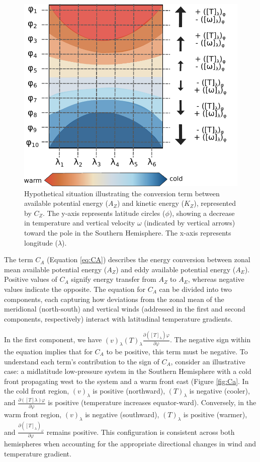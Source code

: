 \begin{figure}[h]
\begin{center}
\setcaptionmargin{1cm}
\includegraphics[width=0.75\columnwidth,angle=0]{fig/Cz.pdf}
\caption[$C_Z$ - representation]{Hypothetical situation illustrating the conversion term between available potential energy ($A_Z$) and kinetic energy ($K_Z$), represented by $C_Z$. The y-axis represents latitude circles ($\phi$), showing a decrease in temperature and vertical velocity $\omega$ (indicated by vertical arrows) toward the pole in the Southern Hemisphere. The x-axis represents longitude ($\lambda$).}
\label{Cz}
\end{center}
\end{figure}


The term $C_A$ (Equation \ref{eq:CA}) describes the energy conversion between zonal mean available potential energy ($A_Z$) and eddy available potential energy ($A_E$). Positive values of $C_A$ signify energy transfer from $A_Z$ to $A_E$, whereas negative values indicate the opposite. The equation for $C_A$ can be divided into two components, each capturing how deviations from the zonal mean of the meridional (north-south) and vertical winds (addressed in the first and second components, respectively) interact with latitudinal temperature gradients.

In the first component, we have $(v)_\lambda (T)_\lambda \frac{\partial ([T]_\lambda)\varphi}{\partial \varphi}$. The negative sign within the equation implies that for $C_A$ to be positive, this term must be negative. To understand each term's contribution to the sign of $C_A$, consider an illustrative case: a midlatitude low-pressure system in the Southern Hemisphere with a cold front propagating west to the system and a warm front east (Figure \ref{fig:Ca}. In the cold front region, $(v)_\lambda$ is positive (northward), $(T)_\lambda$ is negative (cooler), and $\frac{\partial ([T]\lambda)\varphi}{\partial \varphi}$ is positive (temperature increases equator-ward). Conversely, in the warm front region, $(v)_\lambda$ is negative (southward), $(T)_\lambda$ is positive (warmer), and $\frac{\partial ([T]_\lambda)_\varphi}{\partial \varphi}$ remains positive. This configuration is consistent across both hemispheres when accounting for the appropriate directional changes in wind and temperature gradient.


